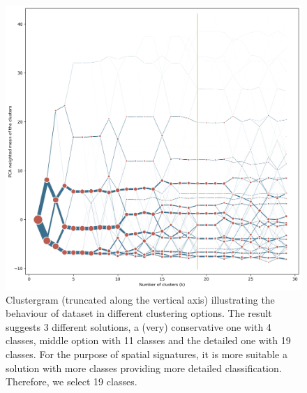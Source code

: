 \begin{figure}
    \includegraphics[width=\linewidth]{figures/clustergram_med.png}
    \caption{Clustergram (truncated along the vertical axis) illustrating the behaviour
    of dataset in different clustering options. The result suggests 3 different
    solutions, a (very) conservative one with 4 classes, middle option with 11 classes
    and the detailed one with 19 classes. For the purpose of spatial signatures, it is
    more suitable a solution with more classes providing more detailed classification.
    Therefore, we select 19 classes.
    }
    \label{fig:cgram_med}
\end{figure}

